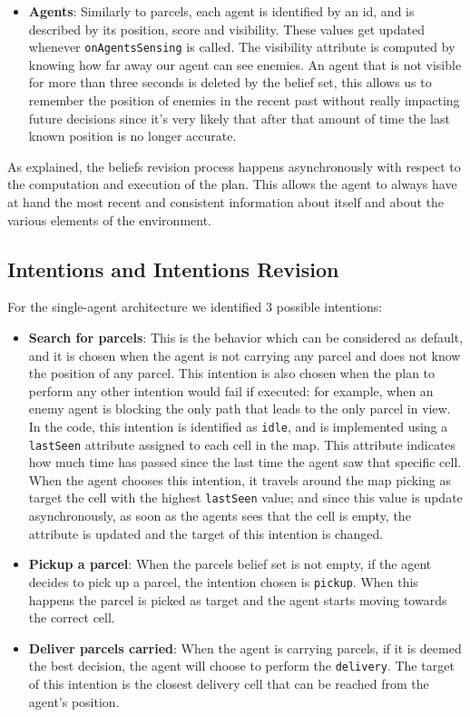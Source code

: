 \documentclass[a4paper, 11pt]{article}
\begin{document}
\begin{itemize}
\item \textbf{Agents}: Similarly to parcels, each agent is identified by an id, and is described by its position, score and visibility. These values get updated whenever \verb|onAgentsSensing| is called. The visibility attribute is computed by knowing how far away our agent can see enemies. An agent that is not visible for more than three seconds is deleted by the belief set, this allows us to remember the position of enemies in the recent past without really impacting future decisions since it's very likely that after that amount of time the last known position is no longer accurate.
\end{itemize}

As explained, the beliefs revision process happens asynchronously with respect to the computation and execution of the plan. This allows the agent to always have at hand the most recent and consistent information about itself and about the various elements of the environment.

\subsection{Intentions and Intentions Revision}
For the single-agent architecture we identified 3 possible intentions:
\begin{itemize}
\item \textbf{Search for parcels}: This is the behavior which can be considered as default, and it is chosen when the agent is not carrying any parcel and does not know the position of any parcel. This intention is also chosen when the plan to perform any other intention would fail if executed: for example, when an enemy agent is blocking the only path that leads to the only parcel in view. In the code, this intention is identified as \verb|idle|, and is implemented using a \verb|lastSeen| attribute assigned to each cell in the map. This attribute indicates how much time has passed since the last time the agent saw that specific cell. When the agent chooses this intention, it travels around the map picking as target the cell with the highest \verb|lastSeen| value; and since this value is update asynchronously, as soon as the agents sees that the cell is empty, the attribute is updated and the target of this intention is changed.
\item \textbf{Pickup a parcel}: When the parcels belief set is not empty, if the agent decides to pick up a parcel, the intention chosen is \verb|pickup|. When this happens the parcel is picked as target and the agent starts moving towards the correct cell.
\item \textbf{Deliver parcels carried}: When the agent is carrying parcels, if it is deemed the best decision, the agent will choose to perform the \verb|delivery|. The target of this intention is the closest delivery cell that can be reached from the agent's position.
\end{itemize}
\end{document}
